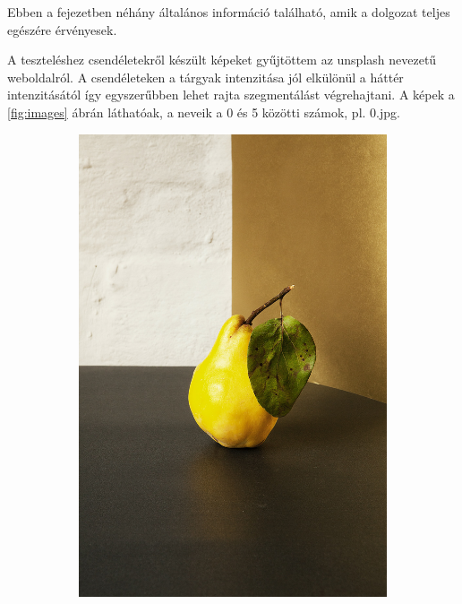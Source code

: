 
Ebben a fejezetben néhány általános információ található, amik a dolgozat teljes egészére érvényesek.


A teszteléshez csendéletekről készült képeket gyűjtöttem az unsplash nevezetű weboldalról. \cite{unsplash}
A csendéleteken a tárgyak intenzitása jól elkülönül a háttér intenzitásától így egyszerűbben lehet rajta szegmentálást végrehajtani.
A képek a \ref{fig:images} ábrán láthatóak, a neveik a 0 és 5 közötti számok, pl. 0.jpg.

\begin{figure}[htb]
    \centering %
\begin{subfigure}{0.25\textwidth}
  \includegraphics[width=\linewidth]{../images/0.jpg}

\end{subfigure}
\end{figure}
